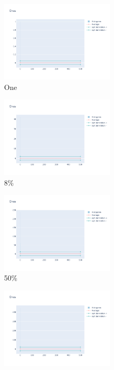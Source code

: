 \documentclass[12pt, fleqn]{report}                             %
\theoremstyle{break}                                            %
\begin{document}
      \begin{figure}[ht!]
        \centering
        \begin{subfigure}[b]{0.4\linewidth}
          \includegraphics[width=0.6\textwidth]{Images/32/dia-a.png}
          \caption{One}
        \end{subfigure}
        \begin{subfigure}[b]{0.4\linewidth}
          \includegraphics[width=0.6\textwidth]{Images/32/dia-b.png}
          \caption{8\%}
        \end{subfigure}
        \begin{subfigure}[b]{0.4\linewidth}
          \includegraphics[width=0.6\textwidth]{Images/32/dia-c.png}
          \caption{50\%}
        \end{subfigure}
        \begin{subfigure}[b]{0.4\linewidth}
          \includegraphics[width=0.6\textwidth]{Images/32/dia-d.png}

\end{subfigure}
\end{figure}
\end{document}
